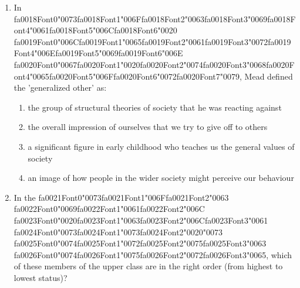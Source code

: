 \documentclass[12pt]{article}
\begin{document}
\begin{enumerate}[label=\arabic*.]
\begin{enumerate}[label=(\alph*)]
    \item an empire with a bureaucratic administration but no political centre
    \item an awareness of risks and dangers that affect the environment as a whole
    \item a unit with a division of labour that extends across ethnic and cultural groups
\end{enumerate}
\item In {\csname fa0018Font0\endcsname\char"0073}{\csname fa0018Font1\endcsname\char"006F}{\csname fa0018Font2\endcsname\char"0063}{\csname fa0018Font3\endcsname\char"0069}{\csname fa0018Font4\endcsname\char"0061}{\csname fa0018Font5\endcsname\char"006C}{\csname fa0018Font6\endcsname\char"0020} {\csname fa0019Font0\endcsname\char"006C}{\csname fa0019Font1\endcsname\char"0065}{\csname fa0019Font2\endcsname\char"0061}{\csname fa0019Font3\endcsname\char"0072}{\csname fa0019Font4\endcsname\char"006E}{\csname fa0019Font5\endcsname\char"0069}{\csname fa0019Font6\endcsname\char"006E} {\csname fa0020Font0\endcsname\char"0067}{\csname fa0020Font1\endcsname\char"0020}{\csname fa0020Font2\endcsname\char"0074}{\csname fa0020Font3\endcsname\char"0068}{\csname fa0020Font4\endcsname\char"0065}{\csname fa0020Font5\endcsname\char"006F}{\csname fa0020Font6\endcsname\char"0072}{\csname fa0020Font7\endcsname\char"0079}, Mead defined the 'generalized other' as:
\begin{enumerate}[label=(\alph*)]
    \item the group of structural theories of society that he was reacting against
    \item the overall impression of ourselves that we try to give off to others
    \item a significant figure in early childhood who teaches us the general values of society
    \item an image of how people in the wider society might perceive our behaviour
\end{enumerate}
\item In the {\csname fa0021Font0\endcsname\char"0073}{\csname fa0021Font1\endcsname\char"006F}{\csname fa0021Font2\endcsname\char"0063} {\csname fa0022Font0\endcsname\char"0069}{\csname fa0022Font1\endcsname\char"0061}{\csname fa0022Font2\endcsname\char"006C} {\csname fa0023Font0\endcsname\char"0020}{\csname fa0023Font1\endcsname\char"0063}{\csname fa0023Font2\endcsname\char"006C}{\csname fa0023Font3\endcsname\char"0061} {\csname fa0024Font0\endcsname\char"0073}{\csname fa0024Font1\endcsname\char"0073}{\csname fa0024Font2\endcsname\char"0020}{\char"0073} {\csname fa0025Font0\endcsname\char"0074}{\csname fa0025Font1\endcsname\char"0072}{\csname fa0025Font2\endcsname\char"0075}{\csname fa0025Font3\endcsname\char"0063} {\csname fa0026Font0\endcsname\char"0074}{\csname fa0026Font1\endcsname\char"0075}{\csname fa0026Font2\endcsname\char"0072}{\csname fa0026Font3\endcsname\char"0065}, which of these members of the upper class are in the right order (from highest to lowest status)?

\end{enumerate}
\end{document}
